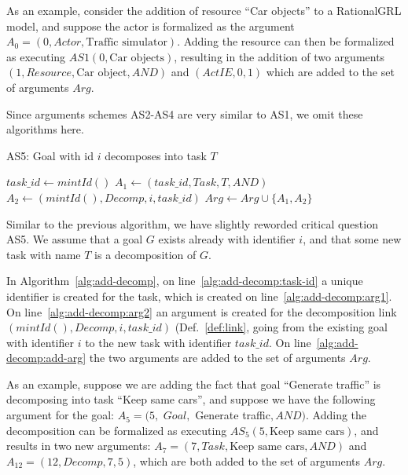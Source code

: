 As an example, consider the addition of resource ``Car objects'' to a RationalGRL model, and suppose the actor is formalized as the argument $A_0 = (0, Actor, \text{Traffic simulator})$. Adding the resource can then be formalized as executing $AS1(0, \text{Car objects})$, resulting in the addition of two arguments $(1, Resource, \text{Car object}, AND)$ and $(ActIE, 0, 1)$ which are added to the set of arguments $Arg$.

Since arguments schemes AS2-AS4 are very similar to AS1, we omit these algorithms here.

\begin{algorithm}[h]
  \caption{AS5: Goal with id $i$ decomposes into task $T$}\label{alg:add-decomp}
  \begin{algorithmic}[1]
    \State $task\_id\gets mintId()$\label{alg:add-decomp:task-id}
    \State $A_1\leftarrow (task\_id, Task, T, AND)$\label{alg:add-decomp:arg1}
    \State $A_2\leftarrow (mintId(), Decomp, i, task\_id)$\label{alg:add-decomp:arg2}
    \State $Arg\gets Arg\cup \{A_1,A_2\}$\label{alg:add-decomp:add-arg}
    \EndProcedure
  \end{algorithmic}
\end{algorithm}

Similar to the previous algorithm, we have slightly reworded critical question AS5. We assume that a goal $G$ exists already with identifier $i$, and that some new task with name $T$ is a decomposition of $G$. 

In Algorithm~\ref{alg:add-decomp}, on line~\ref{alg:add-decomp:task-id} a unique identifier is created for the task, which is created on line~\ref{alg:add-decomp:arg1}. On line~\ref{alg:add-decomp:arg2} an argument is created for the decomposition link $(mintId(), Decomp, i, task\_id)$ (Def.~\ref{def:link}, going from the existing goal with identifier $i$ to the new task with identifier $task\_id$. On line~\ref{alg:add-decomp:add-arg} the two arguments are added to the set of arguments $Arg$.

As an example, suppose we are adding the fact that goal ``Generate traffic'' is decomposing into task ``Keep same cars'', and suppose we have the following argument for the goal: $A_5 = (5,$ $Goal,$ Generate traffic$, AND)$. Adding the decomposition can be formalized as executing $AS_5(5, \text{Keep same cars})$, and results in two new arguments: $A_7 = (7, Task, \text{Keep same cars}, AND)$ and $A_{12} = (12, Decomp, 7, 5)$, which are both added to the set of arguments $Arg$.

